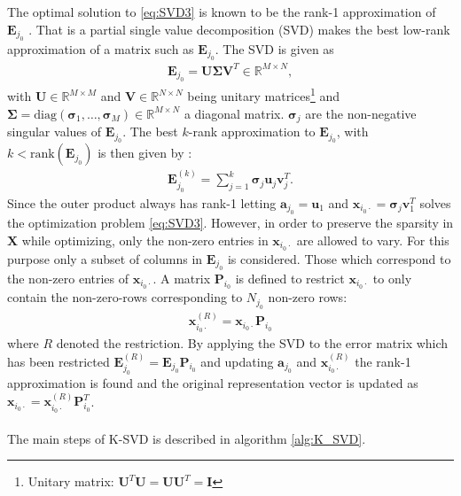 The optimal solution to \eqref{eq:SVD3} is known to be the rank-1 approximation of $\mathbf{E}_{j_{0}}$ \cite[p. 232]{Elad_book}. That is a partial single value decomposition (SVD) makes the best low-rank approximation of a matrix such as $\mathbf{E}_{j_0}$. 
The SVD is given as
\begin{align*}
\mathbf{E}_{j_0} = \mathbf{U} \boldsymbol{\Sigma} \mathbf{V}^T \in \mathbb{R}^{M \times N},
\end{align*}
with $\mathbf{U} \in \mathbb{R}^{M \times M}$ and $\mathbf{V} \in \mathbb{R}^{N \times N}$ being unitary matrices\footnote{Unitary matrix: $\mathbf{U}^T \mathbf{U} = \mathbf{UU}^T = \mathbf{I}$} and $\boldsymbol{\Sigma} = \text{diag}\left(\boldsymbol{\sigma}_1, \dots, \boldsymbol{\sigma}_M \right) \in \mathbb{R}^{M \times N}$ a diagonal matrix. $\boldsymbol{\sigma}_j$ are the non-negative singular values of $\mathbf{E}_{j_0}$. 
The best $k$-rank approximation to $\mathbf{E}_{j_0}$, with $k < \text{rank}(\mathbf{E}_{j_0})$ is then given by \cite[p. 232]{Elad_book}: 
\begin{align*}
\mathbf{E}_{j_{0}}^{(k)} = \sum_{j=1}^{k} \boldsymbol{\sigma}_j \mathbf{u}_{j} \mathbf{v}_{j}^T.
\end{align*} 
Since the outer product always has rank-1 letting $\mathbf{a}_{j_0} = \mathbf{u}_1$ and $\mathbf{x}_{i_0 \cdot} = \boldsymbol{\sigma}_{j} \mathbf{v}_{1}^T$ solves the optimization problem \eqref{eq:SVD3}.
However, in order to preserve the sparsity in $\mathbf{X}$ while optimizing, only the non-zero entries in $\mathbf{x}_{i_0 \cdot}$ are allowed to vary. 
For this purpose only a subset of columns in $\mathbf{E}_{j_0}$ is considered.
Those which correspond to the non-zero entries of $\mathbf{x}_{i_0 \cdot}$. 
A matrix $\mathbf{P}_{i_0}$ is defined to restrict $\mathbf{x}_{i_0 \cdot}$ to only contain the non-zero-rows corresponding to $N_{j_0}$ non-zero rows:
\begin{align*}
\mathbf{x}_{i_0 \cdot}^{(R)} = \mathbf{x}_{i_0 \cdot} \mathbf{P}_{i_0}
\end{align*}
where $R$ denoted the restriction. By applying the SVD to the error matrix which has been restricted $\mathbf{E}_{j_0}^{(R)} = \mathbf{E}_{j_0} \mathbf{P}_{i_0}$ and updating $\mathbf{a}_{j_0}$ and $\mathbf{x}_{i_0 \cdot}^{(R)}$ the rank-1 approximation is found and the original representation vector is updated as $\mathbf{x}_{i_0 \cdot} = \mathbf{x}_{i_0 \cdot}^{(R)} \mathbf{P}_{i_0}^{T}$.  
\\ \\
The main steps of K-SVD is described in algorithm \ref{alg:K_SVD}. 
